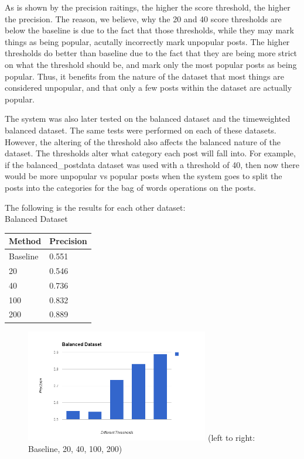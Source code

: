 \documentclass{acm_proc_article-sp}
\begin{document}
As is shown by the precision raitings, the higher the score threshold, the higher the precision. The reason, we believe, why the 20 and 40 score thresholds are below the baseline is due to the fact that those thresholds, while they may mark things as being popular, acutally incorrectly mark unpopular posts. The higher thresholds do better than baseline due to the fact that they are being more strict on what the threshold should be, and mark only the most popular posts as being popular. Thus, it benefits from the nature of the dataset that most things are considered unpopular, and that only a few posts within the dataset are actually popular.

The system was also later tested on the balanced dataset and the timeweighted balanced dataset. The same tests were performed on each of these datasets. However, the altering of the threshold also affects the balanced nature of the dataset. The thresholds alter what category each post will fall into. For example, if the balanced\_postdata dataset was used with a threshold of 40, then now there would be more unpopular vs popular posts when the system goes to split the posts into the categories for the bag of words operations on the posts. 

The following is the results for each other dataset:\\
Balanced Dataset\\
\begin{tabular}{l|l}
Method & Precision\\
\hline
Baseline & 0.551\\
20 & 0.546\\
40 & 0.736\\
100 & 0.832\\
200 & 0.889\\
\end{tabular}

\begin{figure}[h!]
\includegraphics[width=8cm]{balanced-dataset-keyword.png}
(left to right: Baseline, 20, 40, 100, 200)
\end{figure}
\end{document}
